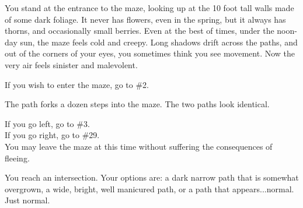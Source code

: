 \documentclass[green]{gl2018}
\begin{document}
\begin{large}
\begin{location}{1}
You stand at the entrance to the maze, looking up at the 10 foot tall walls made of some dark foliage. It never has flowers, even in the spring, but it always has thorns, and occasionally small berries. Even at the best of times, under the noon-day sun, the maze feels cold and creepy. Long shadows drift across the paths, and out of the corners of your eyes, you sometimes think you see movement. Now the very air feels sinister and malevolent. 

\begin{fromhere}If you wish to enter the maze, go to \#2.\end{fromhere}
\end{location}
\begin{location}{2}
The path forks a dozen steps into the maze. The two paths look identical.  
\begin{fromhere}
If you go left, go to \#3. \\
If you go right, go to \#29.\\
You may leave the maze at this time without suffering the consequences of fleeing.
\end{fromhere}
\end{location}
\begin{location}{3}
You reach an intersection. Your options are: a dark narrow path that is somewhat overgrown, a wide, bright, well manicured path, or a path that appears...normal.  Just normal.


\end{location}
\end{large}
\end{document}
